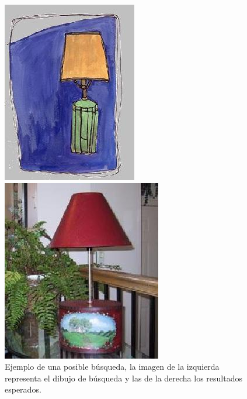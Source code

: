 \documentclass[conference]{IEEEtran}
\begin{document}
\begin{figure}[H]
\begin{multicols}{4}
    \includegraphics[width=0.95\linewidth]{image/lamp2.jpg} \par
    \includegraphics[width=0.95\linewidth]{image/lamp3.jpg} \par
\end{multicols}
\caption{Ejemplo de una posible búsqueda, la imagen de la izquierda representa el dibujo de búsqueda y las de la derecha los resultados esperados.}
\end{figure}
    
\end{document}
